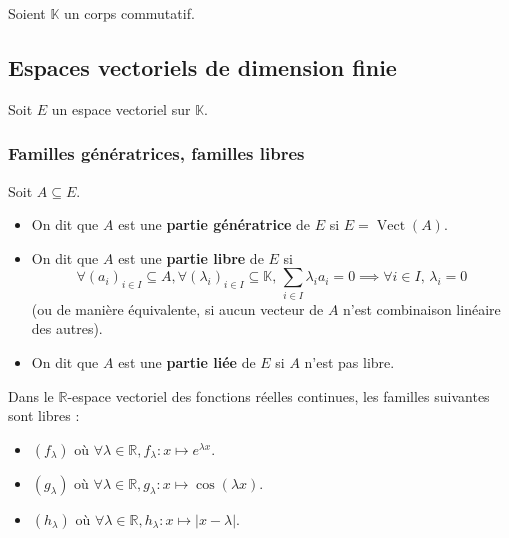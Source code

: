 




	Soient $\mathbb{K}$ un corps commutatif.

	\subsection{Espaces vectoriels de dimension finie}

	Soit $E$ un espace vectoriel sur $\mathbb{K}$.

	\subsubsection{Familles génératrices, familles libres}


	\begin{definition}
		Soit $A \subseteq E$.
		\begin{itemize}
			\item On dit que $A$ est une \textbf{partie génératrice} de $E$ si $E = \operatorname{Vect}(A)$.
			\item On dit que $A$ est une \textbf{partie libre} de $E$ si
			\[ \forall (a_i)_{i \in I} \subseteq A, \forall (\lambda_i)_{i \in I} \subseteq \mathbb{K}, \, \sum_{i \in I} \lambda_i a_i = 0 \implies \forall i \in I, \, \lambda_i = 0 \]
			(ou de manière équivalente, si aucun vecteur de $A$ n'est combinaison linéaire des autres).
			\item On dit que $A$ est une \textbf{partie liée} de $E$ si $A$ n'est pas libre.
		\end{itemize}
	\end{definition}

	\begin{example}
		Dans le $\mathbb{R}$-espace vectoriel des fonctions réelles continues, les familles suivantes sont libres :
		\begin{itemize}
			\item $(f_\lambda)$ où $\forall \lambda \in \mathbb{R}, f_\lambda : x \mapsto e^{\lambda x}$.
			\item $(g_\lambda)$ où $\forall \lambda \in \mathbb{R}, g_\lambda : x \mapsto \cos(\lambda x)$.
			\item $(h_\lambda)$ où $\forall \lambda \in \mathbb{R}, h_\lambda : x \mapsto |x - \lambda|$.
		\end{itemize}
	\end{example}


